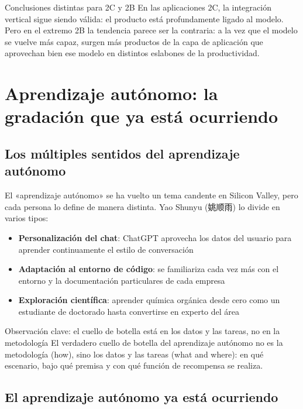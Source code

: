 \documentclass[a4paper]{article}
\begin{document}
\begin{warningbox}{Conclusiones distintas para 2C y 2B}
En las aplicaciones 2C, la integración vertical sigue siendo válida: el producto está profundamente ligado al modelo. Pero en el extremo 2B la tendencia parece ser la contraria: a la vez que el modelo se vuelve más capaz, surgen más productos de la capa de aplicación que aprovechan bien ese modelo en distintos eslabones de la productividad.
\end{warningbox}

\section{Aprendizaje autónomo: la gradación que ya está ocurriendo}

\subsection{Los múltiples sentidos del aprendizaje autónomo}

El «aprendizaje autónomo» se ha vuelto un tema candente en Silicon Valley, pero cada persona lo define de manera distinta. Yao Shunyu (姚顺雨) lo divide en varios tipos:

\begin{itemize}
\item \textbf{Personalización del chat}: ChatGPT aprovecha los datos del usuario para aprender continuamente el estilo de conversación
\item \textbf{Adaptación al entorno de código}: se familiariza cada vez más con el entorno y la documentación particulares de cada empresa
\item \textbf{Exploración científica}: aprender química orgánica desde cero como un estudiante de doctorado hasta convertirse en experto del área
\end{itemize}

\begin{importantbox}{Observación clave: el cuello de botella está en los datos y las tareas, no en la metodología}
El verdadero cuello de botella del aprendizaje autónomo no es la metodología (how), sino los datos y las tareas (what and where): en qué escenario, bajo qué premisa y con qué función de recompensa se realiza.
\end{importantbox}

\subsection{El aprendizaje autónomo ya está ocurriendo}
\end{document}
